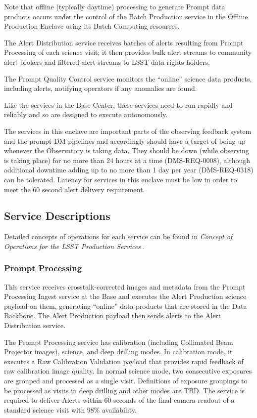 \documentclass[DM,toc]{lsstdoc}
\begin{document}
Note that offline (typically daytime) processing to generate Prompt data products occurs under the control of the Batch Production service in the Offline Production Enclave using its Batch Computing resources.

The Alert Distribution service receives batches of alerts resulting from Prompt Processing of each science visit; it then provides bulk alert streams to community alert brokers and filtered alert streams to LSST data rights holders.

The Prompt Quality Control service monitors the ``online'' science data
products, including alerts, notifying operators if any anomalies are
found.

Like the services in the Base Center, these services need to run
rapidly and reliably and so are designed to execute autonomously.

The services in this enclave are important parts of the observing feedback system and the prompt DM pipelines and accordingly should have a target of being up whenever the Observatory is taking data.
They should be down (while observing is taking place) for no more than 24 hours at a time (DMS-REQ-0008), although additional downtime adding up to no more than 1 day per year (DMS-REQ-0318) can be tolerated.
Latency for services in this enclave must be low in order to meet the 60 second alert delivery requirement.

\subsection{Service Descriptions}\label{prompt-ncsa-service-descriptions}

Detailed concepts of operations for each service can be found in
\textit{Concept of Operations for the LSST Production Services} .

\subsubsection{Prompt Processing}\label{prompt-processing}

This service receives crosstalk-corrected images and metadata from the
Prompt Processing Ingest service at the Base and executes the Alert
Production science payload on them, generating ``online'' data products
that are stored in the Data Backbone. The Alert Production payload then
sends alerts to the Alert Distribution service.

The Prompt Processing service has calibration (including Collimated Beam
Projector images), science, and deep drilling modes. In calibration
mode, it executes a Raw Calibration Validation payload that provides
rapid feedback of raw calibration image quality. In normal science mode,
two consecutive exposures are grouped and processed as a single visit.
Definitions of exposure groupings to be processed as visits in deep
drilling and other modes are TBD. The service is required to deliver
Alerts within 60 seconds of the final camera readout of a standard
science visit with 98\% availability.
\end{document}
